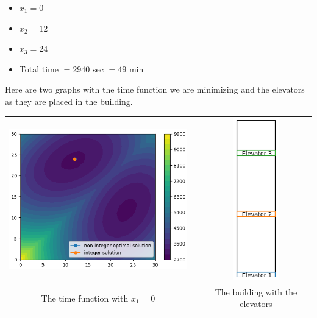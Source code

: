 \begin{enumerate}
\begin{itemize}
	\item $x_1 = 0$
	\item $x_2 = 12$
	\item $x_3 = 24$
	\item Total time $= 2940$ sec $= 49$ min
\end{itemize}	

Here are two graphs with the time function we are minimizing and the elevators as they are placed in the building.

\hspace{-3em}\begin{tabular}{ccc}
\includegraphics[height=200pt]{elevators-time.png}
	& & \includegraphics[height=200pt]{elevators-building.png} \\[-5pt]
The time function with $x_1=0$
	& & The building with the elevators
\end{tabular}


\end{enumerate}
